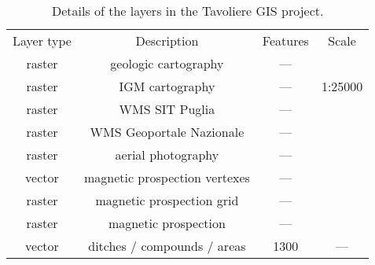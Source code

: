 \begin{table}[!htb]
    \centering
    \begin{tabular}{cccc}
        \toprule
        Layer type & Description          & Features & Scale \\
        \otoprule
        raster     & geologic cartography & ---      &  \\
        raster     & IGM cartography      & ---      & 1:25000 \\
        raster     & WMS SIT Puglia       & ---      &  \\
        raster     & WMS Geoportale Nazionale & ---  &  \\
        raster     & aerial photography   & ---      &  \\
        vector     & magnetic prospection vertexes & --- \\
        raster     & magnetic prospection grid & --- &  \\
        raster     & magnetic prospection & ---      &  \\
        vector     & ditches / compounds / areas & 1300   & --- \\
        \bottomrule
    \end{tabular}
    \caption[List of layers in Tavoliere neolithic GIS project]{Details of the layers in the Tavoliere GIS project.
    \label{tab:layers}
    }
\end{table}

